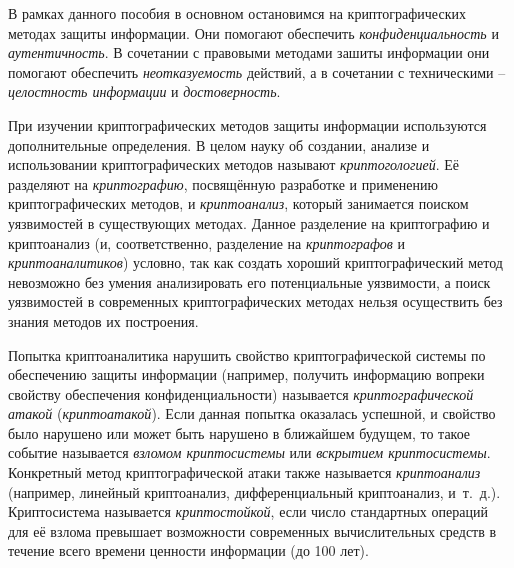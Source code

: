 В рамках данного пособия в основном остановимся на криптографических методах защиты информации. Они помогают обеспечить \emph{конфиденциальность} и \emph{аутентичность}. В сочетании с правовыми методами зашиты информации они помогают обеспечить \emph{неотказуемость} действий, а в сочетании с техническими -- \emph{целостность информации} и \emph{достоверность}.

При изучении криптографических методов защиты информации используются дополнительные определения. В целом науку об создании, анализе и использовании криптографических методов называют \emph{криптогологией}. Её разделяют на \emph{криптографию}, посвящённую разработке и применению криптографических методов, и \emph{криптоанализ}, который занимается поиском уязвимостей в существующих методах. Данное разделение на криптографию и криптоанализ (и, соответственно, разделение на \emph{криптографов} и \emph{криптоаналитиков}) условно, так как создать хороший криптографический метод невозможно без умения анализировать его потенциальные уязвимости, а поиск уязвимостей в современных криптографических методах нельзя осуществить без знания методов их построения.

Попытка криптоаналитика нарушить свойство криптографической системы по обеспечению защиты информации (например, получить информацию вопреки свойству обеспечения конфиденциальности) называется \emph{криптографической атакой} (\emph{криптоатакой}). Если данная попытка оказалась успешной, и свойство было нарушено или может быть нарушено в ближайшем будущем, то такое событие называется \emph{взломом криптосистемы} или \emph{вскрытием криптосистемы}. Конкретный метод криптографической атаки также называется \emph{криптоанализ} (например, линейный криптоанализ, дифференциальный криптоанализ, и~т.~д.). Криптосистема называется \emph{криптостойкой}, если число стандартных операций для её взлома превышает возможности современных вычислительных средств в течение всего времени ценности информации (до 100 лет).

